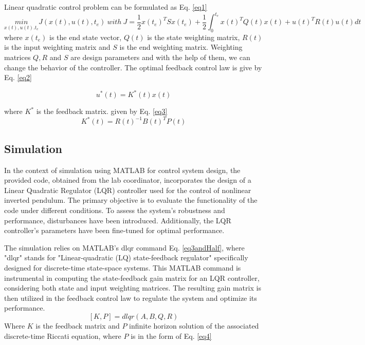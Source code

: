 Linear quadratic control problem can be formulated as Eq. \ref{eq1}
\begin{equation}\label{eq1}
\underset{x(t),u(t).t_e}{min}J(x(t),u(t),t_e)\: with \: J=\frac{1}{2}x(t_e)^TSx(t_e)+\frac{1}{2}\int_{0}^{t_e}x(t)^TQ(t)x(t)+u(t)^TR(t)u(t)dt
\end{equation}
where $x(t_e)$ is the end state vector, $Q(t)$ is the state weighting matrix, $R(t)$ is the input weighting matrix and $S$ is the end weighting matrix. Weighting matrices $Q,R$ and $S$ are design parameters and with the help of them, we can change the behavior of the controller. The optimal feedback control law is give by Eq. \ref{eq2} \cite{lqrLecture}

\begin{equation}\label{eq2}
u^*(t)=K^*(t)x(t)
\end{equation}

where $K^*$ is the feedback matrix. given by Eq. \ref{eq3} \cite{lqrLecture}
\begin{equation}\label{eq3}
K^*(t)=R(t)^{-1}B(t)^TP(t)
\end{equation}

\subsection{Simulation}
In the context of simulation using MATLAB for control system design, the provided code, obtained from the lab coordinator, incorporates the design of a Linear Quadratic Regulator (LQR) controller used for the control of nonlinear inverted pendulum. The primary objective is to evaluate the functionality of the code under different conditions. To assess the system's robustness and performance, disturbances have been introduced. Additionally, the LQR controller's parameters have been fine-tuned for optimal performance.

The simulation relies on MATLAB's dlqr command Eq. \ref{eq3andHalf}, where "dlqr" stands for "Linear-quadratic (LQ) state-feedback regulator" specifically designed for discrete-time state-space systems. This MATLAB command is instrumental in computing the state-feedback gain matrix for an LQR controller, considering both state and input weighting matrices. The resulting gain matrix is then utilized in the feedback control law to regulate the system and optimize its performance. 
\begin{equation}\label{eq3andHalf}
[K,P]=dlqr(A,B,Q,R)
\end{equation}
Where $K$ is the feedback matrix and $P$ infinite horizon solution of the associated discrete-time Riccati equation, where $P$ is in the form of Eq. \ref{eq4}

